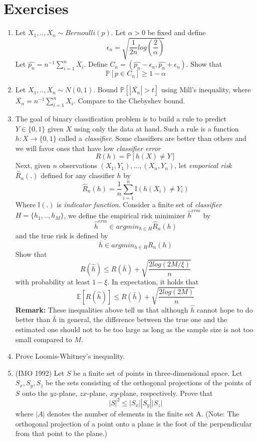 \documentclass[10pt]{article}
\begin{document}
\section{Exercises}
\begin{enumerate}
  \item Let $X_1,..,X_n \sim Bernoulli(p)$. Let $\alpha > 0$ be fixed and define
\[ \epsilon_n = \sqrt{\frac{1}{2n}log(\frac{2}{\alpha})} \] 
Let $\hat{p_n} = n^{-1}\sum_{i=1}^{n}X_i$. Define $C_n = (\hat{p_n}-\epsilon_n, \hat{p_n}+\epsilon_n)$. Show that
\[ \mathbb{P}[p \in C_n] \geqslant 1- \alpha \]
  \item Let $X_1,..,X_n \sim N(0,1)$. Bound $\mathbb{P}[|\bar{X_n}| > t]$ using Mill's inequality, where $\bar{X_n} = n^{-1}\sum_{i=1}^{n}X_i$. Compare to the  Chebyshev bound.
  \item The goal of binary classification problem is to build a rule to predict $Y \in \{0,1\}$ given $X$ using only the data at hand. Such a rule is a function $h: X \longrightarrow \{0,1\}$ called a \textit{classifier}. Some classifiers are better than others and we will favor ones that have low \textit{classifier error} 
\[ R(h)=\mathbb{P}[h(X) \neq Y] \] 
Next, given $n$ observations $(X_1, Y_1),...,(X_n,Y_n)$, let \textit{emporical risk} $\hat{R}_n(.)$ defined for any classifier $h$ by
\[ \hat{R}_n(h) = \frac{1}{n}\sum_{i=1}^{n} \mathbb{I}(h(X_i) \neq Y_i)\]
Where $\mathbb{I}(.)$ is \textit{indicator function}. Consider a finite set of \textit{classifier} $H =\{h_1,..,h_M \}$, we define the empirical risk minimizer $\hat{h}^{erm}$ by
\[ \hat{h}^{erm} \in argmin_{h \in H} \hat{R}_n(h) \]
and the true risk is defined by
\[ \bar{h} \in argmin_{h \in H} R_n(h) \]
Show that
\[ R(\hat{h}) \leqslant R(\bar{h}) + \sqrt{\frac{2log(2M/\xi)}{n}} \]
with probability at least $1-\xi$. In expectation, it holds that
\[ \mathbb{E}[R(\hat{h}) ] \leqslant R(\bar{h}) + \sqrt{\frac{2log(2M)}{n}}\]
\textbf{Remark:} These inequalities above tell us that although $\hat{h}$ cannot hope to do better than $\bar{h}$ in general, the difference between the true one and the estimated one should not to be too large as long as the sample size is not too small compared to $M$. 
\item Prove Loomis-Whitney's inequality.
\item (IMO 1992) Let $S$ be a finite set of points in three-dimensional space. Let $S_x, S_y, S_z$ be the sets consisting of the orthogonal projections of the points of $S$ onto the $yz$-plane, $zx$-plane, $xy$-plane, respectively. Prove that
\[ |S|^2 \leqslant |S_x||S_y||S_z| \]
where $|A|$ denotes the number of elements in the finite set A. (Note: The orthogonal projection of a point onto a plane is the foot of the perpendicular from that point to the plane.)
\end{enumerate}
\end{document}
